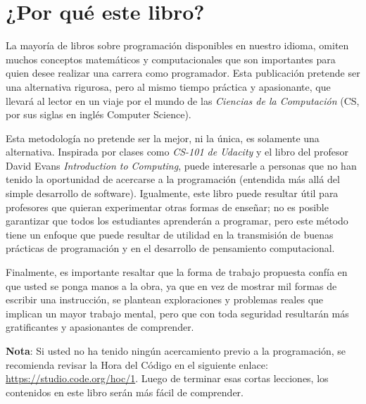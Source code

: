 \thispagestyle{empty}

\chapter{¿Por qué este libro?}
    La mayoría de libros sobre programación disponibles en nuestro idioma, omiten muchos conceptos matemáticos y computacionales que son importantes para quien desee realizar una carrera como programador. Esta publicación pretende ser una alternativa rigurosa, pero al mismo tiempo práctica y apasionante, que llevará al lector en un viaje por el mundo de las \emph{Ciencias de la Computación} (CS, por sus siglas en inglés Computer Science).    
    
    Esta metodología no pretende ser la mejor, ni la única, es solamente una alternativa. Inspirada por clases como \emph{CS-101 de Udacity} y el libro del profesor David Evans \emph{Introduction to Computing}, puede interesarle a personas que no han tenido la oportunidad de acercarse a la programación (entendida más allá del simple desarrollo de software). Igualmente, este libro puede resultar útil para profesores que quieran experimentar otras formas de enseñar; no es posible  garantizar que todos los estudiantes aprenderán a programar, pero este método tiene un enfoque que puede resultar de utilidad en la transmisión de buenas prácticas de programación y en el desarrollo de pensamiento computacional.
    
    Finalmente, es importante resaltar que la forma de trabajo propuesta confía en que usted se ponga manos a la obra, ya que en vez de mostrar mil formas de escribir una instrucción,  se plantean exploraciones y problemas reales que implican un mayor trabajo mental, pero que con toda seguridad resultarán más gratificantes y apasionantes de comprender.
     
    \newpage
    \thispagestyle{empty}
        \textbf{Nota}: Si usted no ha tenido ningún acercamiento previo a la programación, se recomienda revisar la Hora del Código en el siguiente enlace: \url{https://studio.code.org/hoc/1}. Luego de terminar esas cortas lecciones, los contenidos en este libro serán más fácil de comprender.
      
    
  
    
 